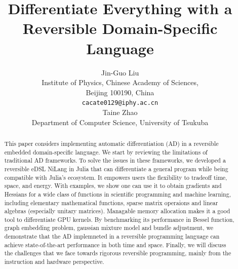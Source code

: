 \documentclass{article}
\newcommand{\<}{\langle}
\renewcommand{\>}{\rangle}
\theoremstyle{definition}\newtheorem{definition}{\textit{Definition}}
\begin{document}
\title{Differentiate Everything with a Reversible Domain-Specific Language}

\author{Jin-Guo Liu\\
Institute of Physics, Chinese Academy of Sciences,\\Beijing 100190, China\\
\texttt{cacate0129@iphy.ac.cn}\\
\And
Taine Zhao\\
Department of Computer Science, University of Tsukuba\\
}



\maketitle

\begin{abstract}
    This paper considers implementing automatic differentiation (AD) in a reversible embedded domain-specific language. We start by reviewing the limitations of traditional AD frameworks. To solve the issues in these frameworks, we developed a reversible eDSL NiLang in Julia that can differentiate a general program while being compatible with Julia's ecosystem. It empowers users the flexibility to tradeoff time, space, and energy. With examples, we show one can use it to obtain gradients and Hessians for a wide class of functions in scientific programming and machine learning, including elementary mathematical functions, sparse matrix operaions and linear algebras (especially unitary matrices). Managable memory allocation makes it a good tool to differentiate GPU kernels.
By benchmarking its performance in Bessel function, graph embedding problem, gaussian mixture model and bundle adjustment, we demonstrate that the AD implemneted in a reversible programming language can achieve state-of-the-art performance in both time and space. Finally, we will discuss the challenges that we face towards rigorous reversible programming, mainly from the instruction and hardware perspective.
\end{abstract}
\end{document}
